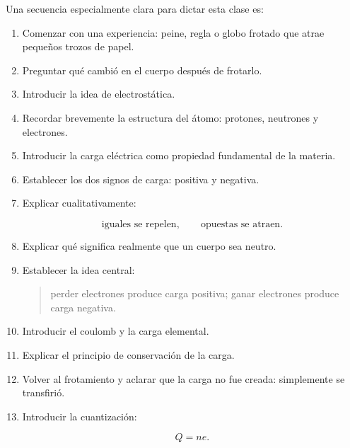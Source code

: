 \begin{notapedagogica}
Una secuencia especialmente clara para dictar esta clase es:

\begin{enumerate}

    \item Comenzar con una experiencia:
    peine, regla o globo frotado que atrae pequeños trozos de papel.

    \item Preguntar qué cambió en el cuerpo después de frotarlo.

    \item Introducir la idea de electrostática.

    \item Recordar brevemente la estructura del átomo:
    protones, neutrones y electrones.

    \item Introducir la carga eléctrica como propiedad fundamental de la
    materia.

    \item Establecer los dos signos de carga:
    positiva y negativa.

    \item Explicar cualitativamente:

    \[
    \text{iguales se repelen},
    \qquad
    \text{opuestas se atraen}.
    \]

    \item Explicar qué significa realmente que un cuerpo sea neutro.

    \item Establecer la idea central:

    \begin{quote}
    perder electrones produce carga positiva;
    ganar electrones produce carga negativa.
    \end{quote}

    \item Introducir el coulomb y la carga elemental.

    \item Explicar el principio de conservación de la carga.

    \item Volver al frotamiento y aclarar que la carga no fue creada:
    simplemente se transfirió.

    \item Introducir la cuantización:

    \[
    Q=ne.
    \]


\end{enumerate}
\end{notapedagogica}
